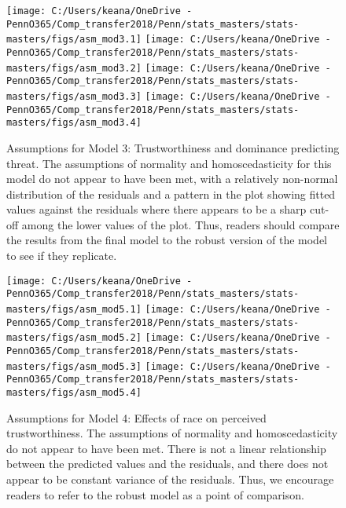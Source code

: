 \documentclass[
  english,
  man, noextraspace,floatsintext]{apa6}
\begin{document}
\begin{figure}
\texttt{[image: C:/Users/keana/OneDrive - PennO365/Comp\_transfer2018/Penn/stats\_masters/stats-masters/figs/asm\_mod3.1]} \texttt{[image: C:/Users/keana/OneDrive - PennO365/Comp\_transfer2018/Penn/stats\_masters/stats-masters/figs/asm\_mod3.2]} \texttt{[image: C:/Users/keana/OneDrive - PennO365/Comp\_transfer2018/Penn/stats\_masters/stats-masters/figs/asm\_mod3.3]} \texttt{[image: C:/Users/keana/OneDrive - PennO365/Comp\_transfer2018/Penn/stats\_masters/stats-masters/figs/asm\_mod3.4]} \caption{Assumptions for Model 3: Trustworthiness and dominance predicting threat. The assumptions of normality and homoscedasticity for this model do not appear to have been met, with a relatively non-normal distribution of the residuals and a pattern in the plot showing fitted values against the residuals where there appears to be a sharp cut-off among the lower values of the plot. Thus, readers should compare the results from the final model to the robust version of the model to see if they replicate.}\label{fig:f19}
\end{figure}

\begin{figure}
\texttt{[image: C:/Users/keana/OneDrive - PennO365/Comp\_transfer2018/Penn/stats\_masters/stats-masters/figs/asm\_mod5.1]} \texttt{[image: C:/Users/keana/OneDrive - PennO365/Comp\_transfer2018/Penn/stats\_masters/stats-masters/figs/asm\_mod5.2]} \texttt{[image: C:/Users/keana/OneDrive - PennO365/Comp\_transfer2018/Penn/stats\_masters/stats-masters/figs/asm\_mod5.3]} \texttt{[image: C:/Users/keana/OneDrive - PennO365/Comp\_transfer2018/Penn/stats\_masters/stats-masters/figs/asm\_mod5.4]} \caption{Assumptions for Model 4: Effects of race on perceived trustworthiness. The assumptions of normality and homoscedasticity do not appear to have been met. There is not a linear relationship between the predicted values and the residuals, and there does not appear to be constant variance of the residuals. Thus, we encourage readers to refer to the robust model as a point of comparison.}\label{fig:f20}
\end{figure}
\end{document}
